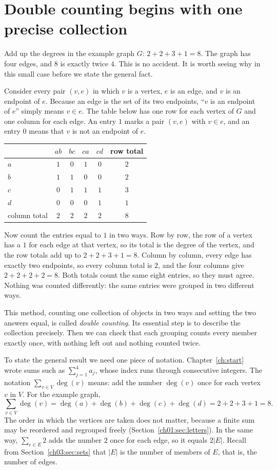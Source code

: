 \section{Double counting begins with one precise collection}\label{ch07:sec:double}
Add up the degrees in the example graph $G$: $2+2+3+1=8$. The graph has four edges, and $8$ is exactly twice $4$. This is no accident. It is worth seeing why in this small case before we state the general fact.

Consider every pair $(v,e)$ in which $v$ is a vertex, $e$ is an edge, and $v$ is an endpoint of $e$. Because an edge is the set of its two endpoints, ``$v$ is an endpoint of $e$'' simply means $v\in e$. The table below has one row for each vertex of $G$ and one column for each edge. An entry $1$ marks a pair $(v,e)$ with $v\in e$, and an entry $0$ means that $v$ is not an endpoint of $e$.
\begin{center}
\begin{tabular}{@{}lccccc@{}}
\toprule
 & $ab$ & $bc$ & $ca$ & $cd$ & row total\\
\midrule
$a$ & $1$ & $0$ & $1$ & $0$ & $2$\\
$b$ & $1$ & $1$ & $0$ & $0$ & $2$\\
$c$ & $0$ & $1$ & $1$ & $1$ & $3$\\
$d$ & $0$ & $0$ & $0$ & $1$ & $1$\\
\midrule
column total & $2$ & $2$ & $2$ & $2$ & $8$\\
\bottomrule
\end{tabular}
\end{center}
Now count the entries equal to $1$ in two ways. Row by row, the row of a vertex has a $1$ for each edge at that vertex, so its total is the degree of the vertex, and the row totals add up to $2+2+3+1=8$. Column by column, every edge has exactly two endpoints, so every column total is $2$, and the four columns give $2+2+2+2=8$. Both totals count the same eight entries, so they must agree. Nothing was counted differently: the same entries were grouped in two different ways.

This method, counting one collection of objects in two ways and setting the two answers equal, is called \emph{double counting}. Its essential step is to describe the collection precisely. Then we can check that each grouping counts every member exactly once, with nothing left out and nothing counted twice.

To state the general result we need one piece of notation. Chapter~\ref{ch:start} wrote sums such as $\sum_{j=1}^{4}a_j$, whose index runs through consecutive integers. The notation $\sum_{v\in V}\deg(v)$ means: add the number $\deg(v)$ once for each vertex $v$ in $V$. For the example graph,
\[
\sum_{v\in V}\deg(v)=\deg(a)+\deg(b)+\deg(c)+\deg(d)=2+2+3+1=8.
\]
The order in which the vertices are taken does not matter, because a finite sum may be reordered and regrouped freely (Section~\ref{ch01:sec:letters}). In the same way, $\sum_{e\in E}2$ adds the number $2$ once for each edge, so it equals $2|E|$. Recall from Section~\ref{ch03:sec:sets} that $|E|$ is the number of members of $E$, that is, the number of edges.

